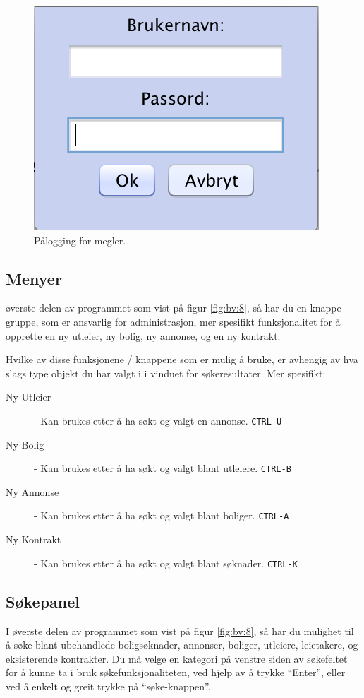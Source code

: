 \begin{figure}[h!]
\center
 \includegraphics[scale=0.7]{./img/brukerveiledning/7.png}
 \caption{Pålogging for megler.}
 \label{fig:bv:7}
\end{figure}




\newpage
\subsection{Menyer}
øverste delen av programmet som vist på figur \ref{fig:bv:8}, så har du en knappe gruppe, som er ansvarlig
for administrasjon, mer spesifikt funksjonalitet for å opprette en ny utleier, ny bolig, ny annonse, og
en ny kontrakt.

Hvilke av disse funksjonene / knappene som er mulig å bruke, er avhengig av hva slags type
objekt du har valgt i i vinduet for søkeresultater. Mer spesifikt:

\begin{description}
\item[Ny Utleier] -
Kan brukes etter å ha søkt og valgt en annonse. \texttt{CTRL-U}
\item[Ny Bolig] -
Kan brukes etter å ha søkt og valgt blant utleiere. \texttt{CTRL-B}
\item[Ny Annonse] -
Kan brukes etter å ha søkt og valgt blant boliger. \texttt{CTRL-A}
\item[Ny Kontrakt] -
Kan brukes etter å ha søkt og valgt blant søknader. \texttt{CTRL-K}
\end{description}





\subsection{Søkepanel}
I øverste delen av programmet som vist på figur \ref{fig:bv:8}, så har du mulighet til å søke blant
ubehandlede boligsøknader, annonser, boliger, utleiere, leietakere, og eksisterende kontrakter.
Du må velge en kategori på venstre siden av søkefeltet for å kunne ta i bruk søkefunksjonaliteten,
ved hjelp av å trykke “Enter”, eller ved å enkelt og greit trykke på “søke-knappen”.


